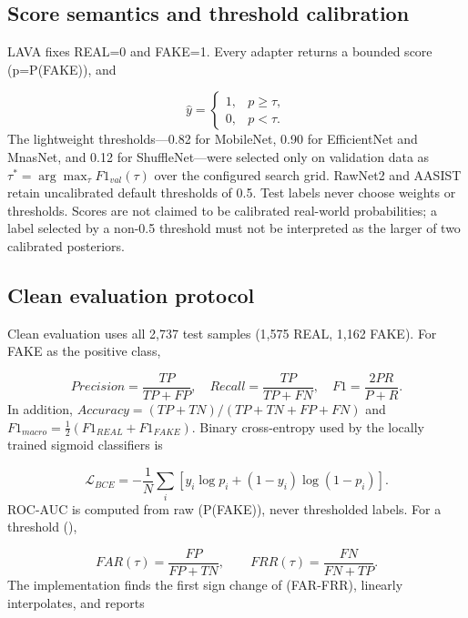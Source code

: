 \documentclass[10pt,journal]{IEEEtran}
\begin{document}
\subsection{Score semantics and threshold calibration}
LAVA fixes REAL=0 and FAKE=1. Every adapter returns a bounded score (p=P(FAKE)), and

\begin{equation}

\hat y=\begin{cases}1,&p\ge\tau,\\0,&p<\tau.\end{cases}

\end{equation}
The lightweight thresholds—0.82 for MobileNet, 0.90 for EfficientNet and MnasNet, and 0.12 for ShuffleNet—were selected only on validation data as $\tau^*=\arg\max_{\tau}F1_{val}(\tau)$ over the configured search grid. RawNet2 and AASIST retain uncalibrated default thresholds of 0.5. Test labels never choose weights or thresholds. Scores are not claimed to be calibrated real-world probabilities; a label selected by a non-0.5 threshold must not be interpreted as the larger of two calibrated posteriors.

\subsection{Clean evaluation protocol}
Clean evaluation uses all 2,737 test samples (1,575 REAL, 1,162 FAKE). For FAKE as the positive class,

\begin{equation}
Precision=\frac{TP}{TP+FP},\quad Recall=\frac{TP}{TP+FN},\quad F1=\frac{2PR}{P+R}.
\end{equation}
In addition, $Accuracy=(TP+TN)/(TP+TN+FP+FN)$ and $F1_{macro}=\frac{1}{2}(F1_{REAL}+F1_{FAKE})$. Binary cross-entropy used by the locally trained sigmoid classifiers is

\begin{equation}
\mathcal{L}_{BCE}=-\frac{1}{N}\sum_i[y_i\log p_i+(1-y_i)\log(1-p_i)].
\end{equation}
ROC-AUC is computed from raw (P(FAKE)), never thresholded labels. For a threshold (\tau),

\begin{equation}
FAR(\tau)=\frac{FP}{FP+TN},\qquad FRR(\tau)=\frac{FN}{FN+TP}.
\end{equation}
The implementation finds the first sign change of (FAR-FRR), linearly interpolates, and reports
\end{document}
